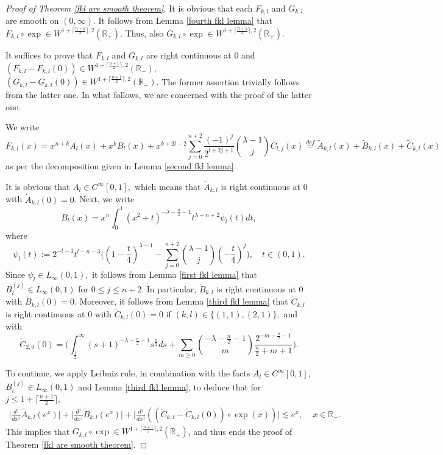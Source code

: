 \documentclass{amsart}
\begin{document}
\begin{proof}[Proof of Theorem \ref{fkl are smooth theorem}]
It is obvious that each $F_{k,l}$ and $G_{k,l}$ are smooth on $(0,\infty).$ It follows from Lemma \ref{fourth fkl lemma} that $F_{k,l}\circ\exp\in W^{1+\lceil\frac{n+1}{2}\rceil,2}(\mathbb{R}_+).$ Thus, also $G_{k,l}\circ\exp\in W^{1+\lceil\frac{n+1}{2}\rceil,2}(\mathbb{R}_+).$

It suffices to prove that $F_{k,l}$ and $G_{k,l}$ are right continuous at $0$ and $(F_{k,l}-F_{k,l}(0))\in W^{1+\lceil\frac{n+1}{2}\rceil,2}(\mathbb{R}_-),$ $(G_{k,l}-G_{k,l}(0))\in W^{1+\lceil\frac{n+1}{2}\rceil,2}(\mathbb{R}_-).$ The former assertion trivially follows from the latter one. In what follows, we are concerned with the proof of the latter one.

We write
$$F_{k,l}(x)=x^{n+k}A_l(x)+x^kB_l(x)+x^{k+2l-2}\sum_{j=0}^{n+2}\frac{(-1)^j}{2^{l+2j+1}}\binom{\lambda-1}{j}C_{l,j}(x)\stackrel{def}{=}\tilde{A}_{k,l}(x)+\tilde{B}_{k,l}(x)+\tilde{C}_{k,l}(x)$$
as per the decomposition given in Lemma \ref{second fkl lemma}.

It is obvious that $A_l\in C^{\infty}[0,1],$ which means that $\tilde{A}_{k,l}$ is right continuous at $0$ with $\tilde{A}_{k,l}(0)=0$. Next, we write
$$B_l(x)=x^n\int_0^1(x^2+t)^{-\lambda-\frac{n}{2}-1}t^{\lambda+n+2}\psi_l(t)dt,$$
where
$$\psi_l(t):=2^{-l-1}t^{l-n-3}\Big((1-\frac{t}{4})^{\lambda-1}-\sum_{j=0}^{n+2}\binom{\lambda-1}{j}(-\frac{t}{4})^j\Big),\quad t\in(0,1).$$
Since $\psi_l\in L_{\infty}(0,1),$ it follows from Lemma \ref{first fkl lemma} that $B_l^{(j)}\in L_{\infty}(0,1)$ for $0\leq j\leq n+2.$ In particular, $\tilde{B}_{k,l}$ is right continuous at $0$ with $\tilde{B}_{k,l}(0)=0$. Moreover, it follows from Lemma \ref{third fkl lemma} that $\tilde{C}_{k,l}$ is right continuous at $0$ with $\tilde{C}_{k,l}(0)=0$ if $(k,l)\in\{(1,1),(2,1)\},$ and with $$\tilde{C}_{2,0}(0)=\Big( \int_{\frac12}^{\infty}(s+1)^{-\lambda-\frac{n}{2}-1}s^{\frac{n}{2}}ds+\sum_{m\geq0}\binom{-\lambda-\frac{n}{2}-1}{m}\frac{2^{-m-\frac{n}{2}-1}}{\frac{n}{2}+m+1}\Big).$$

To continue, we apply Leibniz rule, in combination with the facts $A_l\in C^{\infty}[0,1],$ $B_l^{(j)}\in L_{\infty}(0,1)$ and Lemma \ref{third fkl lemma}, to deduce that for $j\leq 1+\lceil\frac{n+1}{2}\rceil$,
\begin{align*}
\Big|\frac{d^j}{dx^j}\tilde{A}_{k,l}(e^x)\Big|+\Big|\frac{d^j}{dx^j}\tilde{B}_{k,l}(e^x)\Big|+\Big|\frac{d^j}{dx^j}((\tilde{C}_{k,l}-\tilde{C}_{k,l}(0))\circ \exp (x))\Big|\lesssim e^{x},\,\quad
  x\in \mathbb{R}_{-}.
\end{align*}
This implies that $G_{k,l}\circ\exp\in W^{1+\lceil\frac{n+1}{2}\rceil,2}(\mathbb{R}_+)$, and thus ends the proof of Theorem \ref{fkl are smooth theorem}.
\end{proof}
\end{document}
